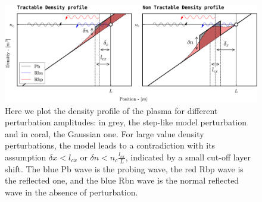 \documentclass[11pt,a4paper,openany]{report}
\begin{document}
\begin{figure}[H]
    \centering
    \hspace*{-0.8cm}\includegraphics[width = 1.03\linewidth]{./figures/density_profile.png}
    \caption{Here we plot the density profile of the plasma for different perturbation amplitudes: in grey, the step-like model perturbation and in coral, the Gaussian one. For large value density perturbations, the model leads to a contradiction with its assumption \(\delta x < l_{cx}\) or \(\delta n < n_c \frac{l_{cx}}{L}\), indicated by a small cut-off layer shift. The blue Pb wave is the probing wave, the red Rbp wave is the reflected one, and the blue Rbn wave is the normal reflected wave in the absence of perturbation.}
    \label{Density_profile}
\end{figure}
\end{document}
